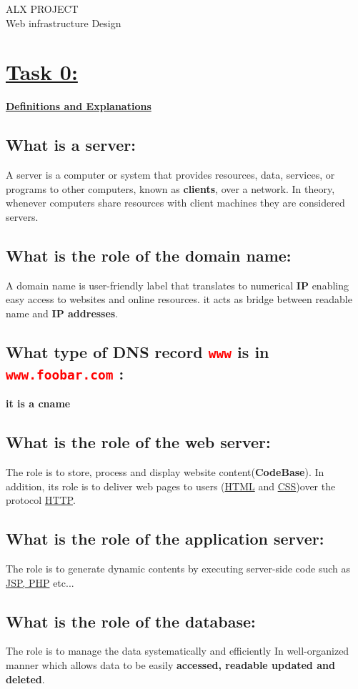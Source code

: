 \documentclass[a4paper, 10pt]{article}
\begin{document}
\justifying
    \begin{center}
        ALX PROJECT \\
        Web infrastructure Design 
    \end{center}
\section*{\underline{Task 0:}}
    \large
    \textbf{\underline{ Definitions and Explanations}}
    \subsection*{What is a server:}
        A server is a computer or system that provides resources, data, services,
        or programs to other computers, known as \textbf{clients}, over a network. In theory, 
        whenever computers share resources with client machines they are considered servers.
    \subsection*{What is the role of the domain name:}
        A domain name is user-friendly label that translates to numerical \textbf{IP}
        enabling easy access to websites and online resources. it acts as bridge
        between readable name and \textbf{IP addresses}.
    \subsection*{What type of DNS record \textcolor{red}{\texttt{www}}  is in 
                                \textcolor{red}{\texttt{ www.foobar.com}} :}
        \textbf{it is a cname}
    \subsection*{What is the role of the web server: }
        The role is to store, process and display website content(\textbf{CodeBase}).
        In addition, its role is to deliver web pages to users 
        (\underline{HTML} and \underline{CSS})over the protocol
        \underline{HTTP}.
    \subsection*{What is the role of the application server: }
        The role is to generate dynamic contents by executing server-side
        code such as \underline{JSP, PHP} etc...
    \subsection*{What is the role of the database: }
        The role is to manage the data systematically and efficiently In
        well-organized manner which allows data to be easily \textbf{accessed, readable 
        updated and deleted}.
\end{document}
